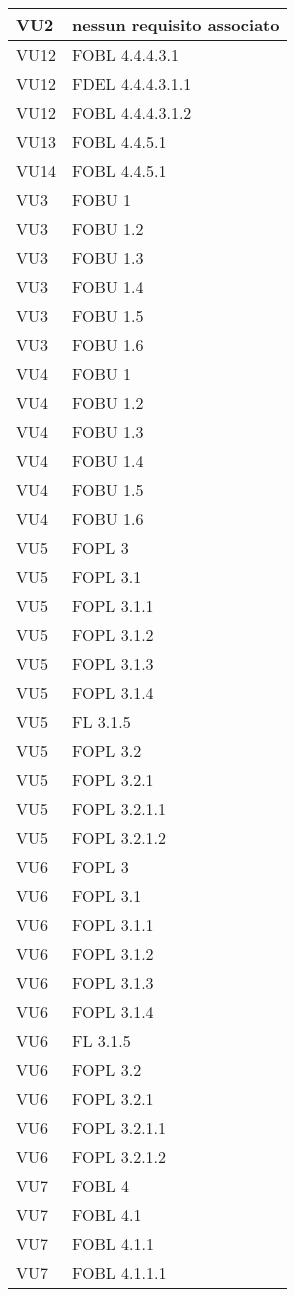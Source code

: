 \begin{longtable}{XX}
\midrule 
VU2&nessun requisito associato\\ 
\midrule 
VU12&FOBL 4.4.4.3.1\\ 
VU12&FDEL 4.4.4.3.1.1\\ 
VU12&FOBL 4.4.4.3.1.2\\ 
\midrule 
VU13&FOBL 4.4.5.1\\ 
\midrule 
VU14&FOBL 4.4.5.1\\ 
\midrule 
VU3&FOBU 1\\ 
VU3&FOBU 1.2\\ 
VU3&FOBU 1.3\\ 
VU3&FOBU 1.4\\ 
VU3&FOBU 1.5\\ 
VU3&FOBU 1.6\\ 
\midrule 
VU4&FOBU 1\\ 
VU4&FOBU 1.2\\ 
VU4&FOBU 1.3\\ 
VU4&FOBU 1.4\\ 
VU4&FOBU 1.5\\ 
VU4&FOBU 1.6\\ 
\midrule 
VU5&FOPL 3\\ 
VU5&FOPL 3.1\\ 
VU5&FOPL 3.1.1\\ 
VU5&FOPL 3.1.2\\ 
VU5&FOPL 3.1.3\\ 
VU5&FOPL 3.1.4\\ 
VU5&FL 3.1.5\\ 
VU5&FOPL 3.2\\ 
VU5&FOPL 3.2.1\\ 
VU5&FOPL 3.2.1.1\\ 
VU5&FOPL 3.2.1.2\\ 
\midrule 
VU6&FOPL 3\\ 
VU6&FOPL 3.1\\ 
VU6&FOPL 3.1.1\\ 
VU6&FOPL 3.1.2\\ 
VU6&FOPL 3.1.3\\ 
VU6&FOPL 3.1.4\\ 
VU6&FL 3.1.5\\ 
VU6&FOPL 3.2\\ 
VU6&FOPL 3.2.1\\ 
VU6&FOPL 3.2.1.1\\ 
VU6&FOPL 3.2.1.2\\ 
\midrule 
VU7&FOBL 4\\ 
VU7&FOBL 4.1\\ 
VU7&FOBL 4.1.1\\ 
VU7&FOBL 4.1.1.1\\ 

\end{longtable}
